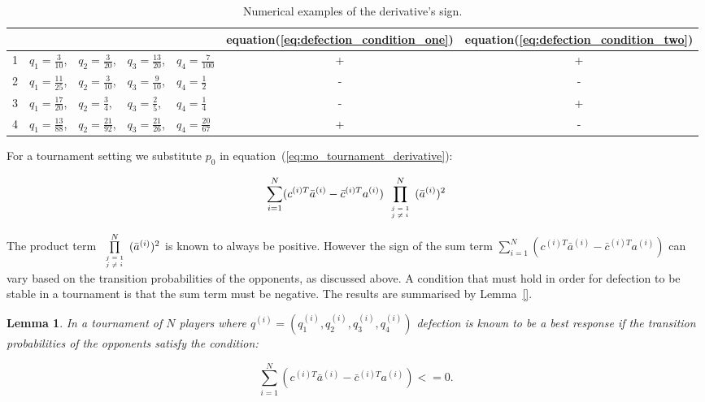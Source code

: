 \documentclass[10pt]{article}
\newtheorem{lemma}[theorem]{Lemma}
\begin{document}
\begin{table}[htbp]
\begin{center}
\begin{tabular}{cllllcc}
    \toprule
    {}& {} & {}& {}& {}&  equation(\ref{eq:defection_condition_one}) &  equation(\ref{eq:defection_condition_two}) \\
    \midrule
1 & \(q_1=\frac{3}{10}\),   & \(q_2=\frac{3}{20}\),  & \(q_3=\frac{13}{20}\), & \(q_4=\frac{7}{100}\)
&  + & + \\
2 & \(q_1=\frac{11}{25}\),  & \(q_2=\frac{3}{10}\),  & \(q_3=\frac{9}{10}\),  & \(q_4=\frac{1}{2}\)
&  - & - \\
3 & \(q_1=\frac{17}{20}\),  & \(q_2=\frac{3}{4}\),   & \(q_3=\frac{2}{5}\),   & \(q_4=\frac{1}{4}\)
&  - & + \\
4 & \(q_1=\frac{13}{88}\),  & \(q_2=\frac{21}{92}\),  & \(q_3=\frac{21}{26}\),  & \(q_4=\frac{20}{67}\)
&  + & - \\
    \bottomrule
\end{tabular}
\end{center}
\caption{Numerical examples of the derivative's sign.}
\label{table:sign_of_derivative}
\end{table}

For a tournament setting we substitute \(p_0\) in equation~(\ref{eq:mo_tournament_derivative}):

\begin{equation}
\sum_{i=1} ^ N (c^{(i)T} \bar{a}^{(i)} - \bar{c}^{(i)T} a^{(i)})
\prod\limits_{\tiny\begin{array}{l} j=1 \\ j \neq i \end{array}} ^ N (\bar{a}^{(i)})^2
\end{equation}

The product term \(\prod\limits_{\tiny\begin{array}{l} j=1 \\ j \neq i \end{array}} ^ N (\bar{a}^{(i)})^2\)
is known to always be positive. However the sign of the sum term 
\(\sum_{i=1} ^ N (c^{(i)T} \bar{a}^{(i)} - \bar{c}^{(i)T} a^{(i)})\) can vary based
on the transition probabilities of the opponents, as discussed above. A condition that
must hold in order for defection to be stable in a tournament is that the sum term
must be negative. The results are summarised by Lemma~\ref{}.

\begin{lemma}
    In a tournament of \(N\) players where \(q^(i) = (q_{1}^(i), q_{2}^(i), q_{3}^(i), q_{4}^(i))\)
    defection is known to be a best response if the transition probabilities of the
    opponents satisfy the condition:

    \begin{equation}
        \sum_{i=1} ^ N (c^{(i)T} \bar{a}^{(i)} - \bar{c}^{(i)T} a^{(i)}) <= 0.
    \end{equation}
\end{lemma}
\end{document}
